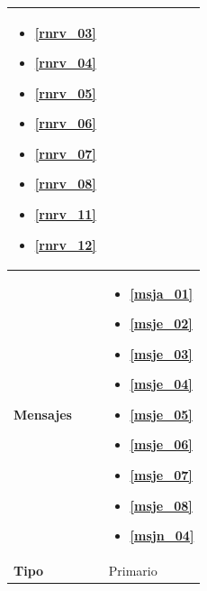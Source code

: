 \begin{center}
\begin{longtable}{| p{3.5cm} | p{11.5cm} |}
\begin{itemize}
               \item \textbf{\ref{rnrv_03}}
               \item \textbf{\ref{rnrv_04}}
               \item \textbf{\ref{rnrv_05}}
               \item \textbf{\ref{rnrv_06}}
               \item \textbf{\ref{rnrv_07}}
               \item \textbf{\ref{rnrv_08}}
               \item \textbf{\ref{rnrv_11}}
               \item \textbf{\ref{rnrv_12}}
             \end{itemize} \\
        \hline
           \textbf{Mensajes} & 
              \begin{itemize}
                 \item \textbf{\ref{msja_01}}
                 \item \textbf{\ref{msje_02}}
                 \item \textbf{\ref{msje_03}}
                 \item \textbf{\ref{msje_04}}
                 \item \textbf{\ref{msje_05}}
                 \item \textbf{\ref{msje_06}}
                 \item \textbf{\ref{msje_07}}
                 \item \textbf{\ref{msje_08}}
                 \item \textbf{\ref{msjn_04}}
              \end{itemize}\\
        \hline
           \textbf{Tipo} & Primario \\
        \hline	    
  \end{longtable}
\end{center}
\endgroup


